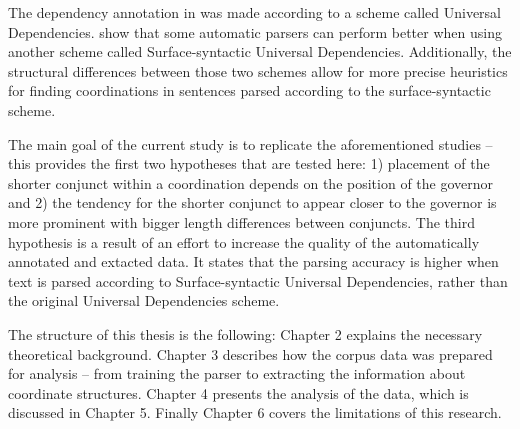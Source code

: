 The dependency annotation in \cite{prz:etal:24} was made according to a scheme called Universal Dependencies. \cite{tuo:prz:lac:21} show that some automatic parsers can perform better when using another scheme called Surface-syntactic Universal Dependencies. Additionally, the structural differences between those two schemes allow for more precise heuristics for finding coordinations in sentences parsed according to the surface-syntactic scheme.

The main goal of the current study is to replicate the aforementioned studies -- this provides the first two hypotheses that are tested here: 1) placement of the shorter conjunct within a coordination depends on the position of the governor and 2) the tendency for the shorter conjunct to appear closer to the governor is more prominent with bigger length differences between conjuncts. The third hypothesis is a result of an effort to increase the quality of the automatically annotated and extacted data. It states that the parsing accuracy is higher when text is parsed according to Surface-syntactic Universal Dependencies, rather than the original Universal Dependencies scheme.

The structure of this thesis is the following: Chapter 2 explains the necessary theoretical background. Chapter 3 describes how the corpus data was prepared for analysis -- from training the parser to extracting the information about coordinate structures. Chapter 4 presents the analysis of the data, which is discussed in Chapter 5. Finally Chapter 6 covers the limitations of this research. 